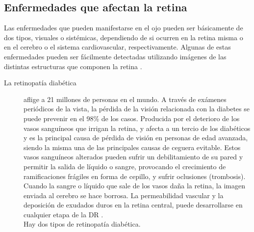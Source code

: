 	
\subsection{Enfermedades que afectan la retina}
Las enfermedades que pueden manifestarse en el ojo pueden ser b\'asicamente de dos tipos, visuales o sist\'emicas, dependiendo de si ocurren en la retina misma o en el cerebro o el sistema cardiovascular, respectivamente. Algunas de estas enfermedades pueden ser f\'acilmente detectadas utilizando im\'agenes de las distintas estructuras que componen la retina \cite{abramoff2010retinal}.
\begin{description}
\item[La retinopat\'ia diab\'etica] aflige a 21 millones de personas en el mundo.  A trav\'es de ex\'amenes peri\'odicos de la vista, la p\'erdida de la visi\'on relacionada con la diabetes se puede prevenir en el 98\% de los casos. Producida por el deterioro de los vasos sangu\'ineos que irrigan la retina,  y afecta a un tercio de los diab\'eticos  y es la principal causa de p\'erdida de visi\'on en personas de edad avanzada,  siendo la misma una de las principales causas de ceguera evitable. Estos vasos sangu\'ineos alterados pueden sufrir un debilitamiento de su pared y permitir la salida de l\'iquido o sangre, provocando el crecimiento de ramificaciones fr\'agiles en forma de cepillo, y sufrir oclusiones (trombosis). Cuando la sangre o l\'iquido que sale de los vasos daña la retina, la imagen enviada al cerebro se hace borrosa. La permeabilidad vascular y la deposici\'on de exudados duros en la retina central, puede desarrollarse en cualquier etapa de la DR \cite{goh2016retinal}.\\

Hay dos tipos de retinopat\'ia diab\'etica. 


\end{description}
